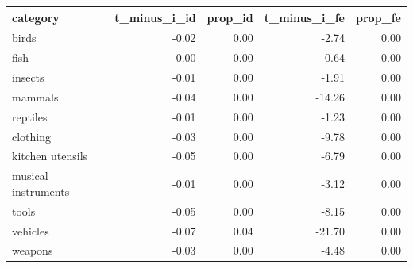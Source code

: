 \begin{table}[ht]
\centering
\begin{tabular}{lrrrr}
  \hline
category & t\_minus\_i\_id & prop\_id & t\_minus\_i\_fe & prop\_fe \\ 
  \hline
birds & -0.02 & 0.00 & -2.74 & 0.00 \\ 
  fish & -0.00 & 0.00 & -0.64 & 0.00 \\ 
  insects & -0.01 & 0.00 & -1.91 & 0.00 \\ 
  mammals & -0.04 & 0.00 & -14.26 & 0.00 \\ 
  reptiles & -0.01 & 0.00 & -1.23 & 0.00 \\ 
  clothing & -0.03 & 0.00 & -9.78 & 0.00 \\ 
  kitchen utensils & -0.05 & 0.00 & -6.79 & 0.00 \\ 
  musical instruments & -0.01 & 0.00 & -3.12 & 0.00 \\ 
  tools & -0.05 & 0.00 & -8.15 & 0.00 \\ 
  vehicles & -0.07 & 0.04 & -21.70 & 0.00 \\ 
  weapons & -0.03 & 0.00 & -4.48 & 0.00 \\ 
   \hline
\end{tabular}
\end{table}
